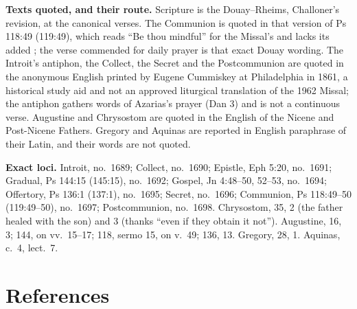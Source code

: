 {\textbf{Texts quoted, and their route.} Scripture is the Douay--Rheims,
Challoner's revision, at the canonical verses. The Communion is quoted in that
version of Ps 118:49 (119:49), which reads ``Be thou mindful'' for the Missal's
 and lacks its added ; the verse commended for
daily prayer is that exact Douay wording. The Introit's antiphon, the Collect,
the Secret and the Postcommunion are quoted in the anonymous English printed by
Eugene Cummiskey at Philadelphia in 1861, a historical study aid and not an
approved liturgical translation of the 1962 Missal; the antiphon gathers words
of Azarias's prayer (Dan 3) and is not a continuous verse. Augustine and
Chrysostom are quoted in the English of the Nicene and Post-Nicene Fathers.
Gregory and Aquinas are reported in English paraphrase of their Latin, and their
words are not quoted.

\textbf{Exact loci.} Introit, no.~1689; Collect, no.~1690; Epistle, Eph 5:20,
no.~1691; Gradual, Ps 144:15 (145:15), no.~1692; Gospel, Jn 4:48--50, 52--53,
no.~1694; Offertory, Ps 136:1 (137:1), no.~1695; Secret, no.~1696; Communion,
Ps 118:49--50 (119:49--50), no.~1697; Postcommunion, no.~1698. Chrysostom,
 35, 2 (the father healed with the son) and 3
(thanks ``even if they obtain it not''). Augustine,  16,
3;  144, on vv.~15--17; 118, sermo 15, on v.~49;
136, 13. Gregory,  28, 1. Aquinas,  c.~4, lect.~7.

\par}

\section*{References}

